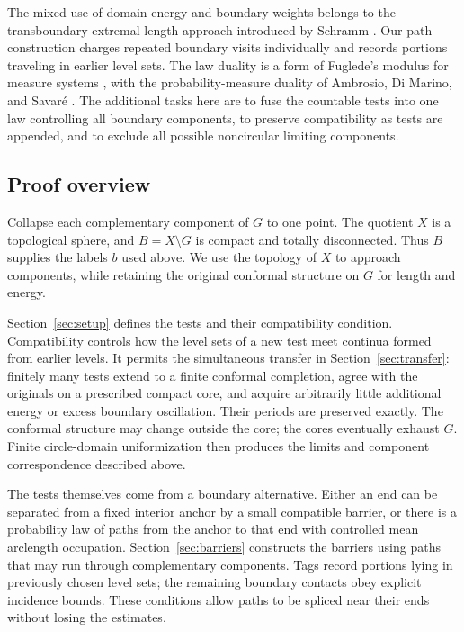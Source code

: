 The mixed use of domain energy and boundary weights belongs to the
transboundary extremal-length approach introduced by Schramm
\cite{Schramm1995}.  Our path construction charges repeated boundary
visits individually and records portions traveling in earlier level
sets.  The law duality is a form of Fuglede's modulus for measure
systems \cite{Fuglede1957}, with the probability-measure duality
of Ambrosio, Di Marino, and Savar\'e
\cite{AmbrosioDiMarinoSavare2015}.  The additional tasks here are
to fuse the countable tests into one law controlling all boundary components,
to preserve compatibility as tests are appended, and to exclude all
possible noncircular limiting components.

\subsection{Proof overview}

Collapse each complementary component of $G$ to one point. The quotient
$X$ is a topological sphere, and $B=X\setminus G$ is compact and totally
disconnected. Thus $B$ supplies the labels $b$ used above. We use the
topology of $X$ to approach components, while retaining the original
conformal structure on $G$ for length and energy.

Section~\ref{sec:setup} defines the tests and their compatibility
condition. Compatibility controls how the level sets of a new test
meet continua formed from earlier levels. It permits the simultaneous
transfer in Section~\ref{sec:transfer}: finitely many tests extend to a
finite conformal completion, agree with the originals on a prescribed
compact core, and acquire arbitrarily little additional energy or
excess boundary oscillation. Their periods are preserved exactly. The
conformal structure may change outside the core; the cores eventually
exhaust $G$. Finite circle-domain uniformization then produces the
limits and component correspondence described above.

The tests themselves come from a boundary alternative. Either an end
can be separated from a fixed interior anchor by a small compatible
barrier, or there is a probability law of paths from the anchor to that
end with controlled mean arclength occupation. Section~\ref{sec:barriers}
constructs the barriers using paths that may run through complementary
components. Tags record portions lying in previously chosen level sets;
the remaining boundary contacts obey explicit incidence bounds. These
conditions allow paths to be spliced near their ends without losing the
estimates.

